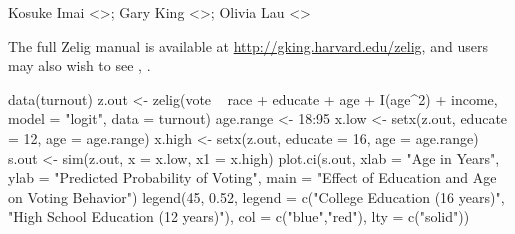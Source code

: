 \begin{Author}\relax
Kosuke Imai <>; Gary King
<>; Olivia Lau <>
\end{Author}
\begin{SeeAlso}\relax
The full Zelig manual is available at
\url{http://gking.harvard.edu/zelig}, and users may also wish to see
, .
\end{SeeAlso}
\begin{Examples}
\begin{ExampleCode}
data(turnout)
z.out <- zelig(vote ~ race + educate + age + I(age^2) + income,
               model = "logit", data = turnout)
age.range <- 18:95
x.low <- setx(z.out, educate = 12, age = age.range)
x.high <- setx(z.out, educate = 16, age = age.range)
s.out <- sim(z.out, x = x.low, x1 = x.high)
plot.ci(s.out, xlab = "Age in Years",
        ylab = "Predicted Probability of Voting",
        main = "Effect of Education and Age on Voting Behavior")
legend(45, 0.52, legend = c("College Education (16 years)",
       "High School Education (12 years)"), col = c("blue","red"), 
       lty = c("solid"))
\end{ExampleCode}
\end{Examples}


